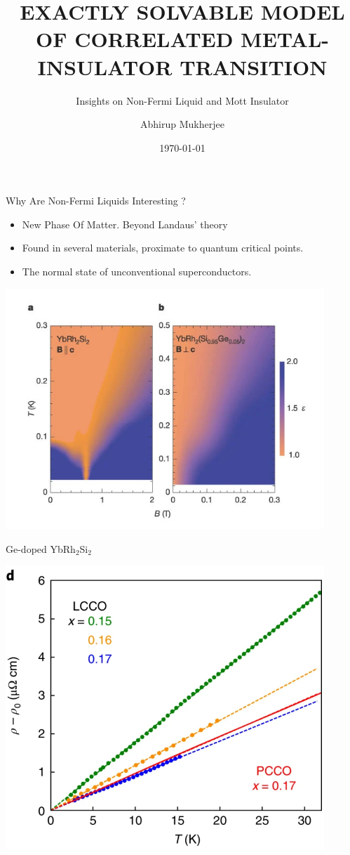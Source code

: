 \documentclass[aspectratio=169]{beamer}
\title{EXACTLY SOLVABLE MODEL OF CORRELATED METAL-INSULATOR TRANSITION}
\subtitle{Insights on Non-Fermi Liquid and Mott Insulator}
\author{Abhirup Mukherjee}
\institute{EPQM Seminar}
\date{\today}
\begin{document}
\centering

\begin{frame}
\maketitle
\end{frame}

\begin{frame}{Why Are Non-Fermi Liquids Interesting ?}
	\begin{itemize}
		\item New Phase Of Matter. Beyond Landaus' theory
		\item Found in several materials, proximate to \alert{quantum critical} points.
		\item The normal state of \alert{unconventional superconductors}.
	\end{itemize}

\begin{minipage}{0.32\textwidth}
	\includegraphics[width=0.9\textwidth]{heavyStrangeMetal.png}

Ge-doped YbRh$_2$Si$_2$
\end{minipage}
\begin{minipage}{0.32\textwidth}
	\includegraphics[width=0.9\textwidth]{cupratesStrange.png}


\end{minipage}
\end{frame}
\end{document}
